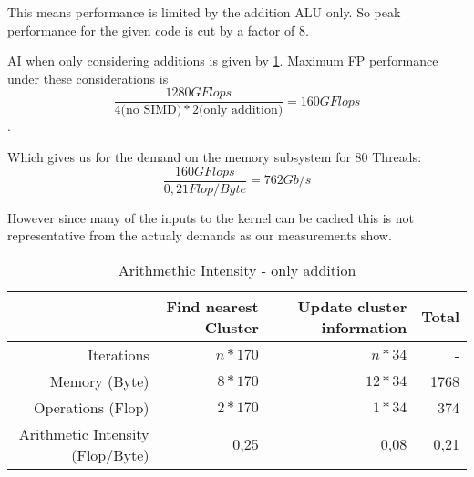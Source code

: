 \documentclass[]{article}
\begin{document}
This means performance is limited by the addition ALU only. So peak performance for the given code is cut by a factor of 8.

AI when only considering additions is given by \ref{tab:AIadd}.
Maximum FP performance under these considerations is $$\frac{1280GFlops}{4 \text{(no SIMD)}  * 2 \text{(only addition)} } = 160 GFlops$$.

Which gives us for the demand on the memory subsystem for 80 Threads:
$$\frac{160 GFlops}{0,21 Flop/Byte} = 762Gb/s$$

However since many of the inputs to the kernel can be cached this is not representative from the actualy demands as our measurements show.


\begin{table}[ht]
	\centering
	\caption{Arithmethic Intensity - only addition}
	\label{tab:AIadd}
	\begin{tabular}{|r|r|r|r|}
		\hline
		& Find nearest Cluster & Update cluster information & Total \\ \hline
		Iterations           & $n * 170$            & $n*34$                     & -     \\ \hline
		Memory (Byte)              & $8*170$              & $12*34$                      & 1768  \\ \hline
		Operations (Flop)          & $2*170$              & $1*34$                       & 374   \\ \hline
		Arithmetic Intensity (Flop/Byte) & 0,25           & 0,08                         & 0,21  \\ \hline
	\end{tabular}
\end{table}
\end{document}
